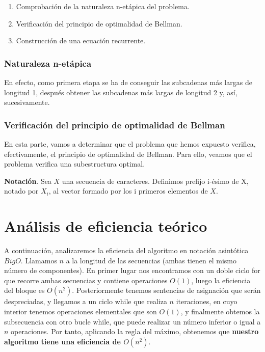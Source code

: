 \begin{enumerate}
    \item Comprobación de la naturaleza n-etápica del problema. 
    \item Verificación del principio de optimalidad de Bellman. 
    \item Construcción de una ecuación recurrente. 
\end{enumerate}

\subsubsection{Naturaleza n-etápica}
En efecto, 
como primera etapa se ha de conseguir las subcadenas más largas de longitud 1, 
después obtener las subcadenas más largas de longitud 2 y, así, sucesivamente. 


\subsubsection{Verificación del principio de optimalidad de Bellman}

En esta parte, vamos a determinar que el problema que hemos expuesto verifica,
efectivamente, el principio de optimalidad de Bellman. Para ello, veamos que el
problema verifica una subestructura optimal.

\textbf{Notación}. Sea $X$ una secuencia de caracteres. Definimos prefijo i-ésimo
de X, notado por $X_i$, al vector formado por los i primeros elementos de $X$. 

\begin{theorem}
    
\end{theorem}


\section{Análisis de eficiencia teórico}

A continuación, analizaremos la eficiencia del algoritmo en notación asintótica $BigO$.
Llamamos $n$ a la longitud de las secuencias (ambas tienen el mismo número de componentes). En primer lugar nos encontramos con un doble ciclo for que recorre ambas
secuencias y contiene operaciones $O(1)$, luego la eficiencia del bloque es $O(n^{2})$.
Posteriormente tenemos sentencias de asignación que serán despreciadas, y llegamos a un
ciclo while que realiza $n$ iteraciones, en cuyo interior tenemos operaciones elementales que son $O(1)$, y finalmente obtemos la subsecuencia con otro bucle while, que puede realizar un número inferior o igual a $n$ operaciones. Por tanto, aplicando la regla del máximo, obtenemos que \textbf{nuestro algoritmo tiene una eficiencia de $O(n^{2})$}.
 



















